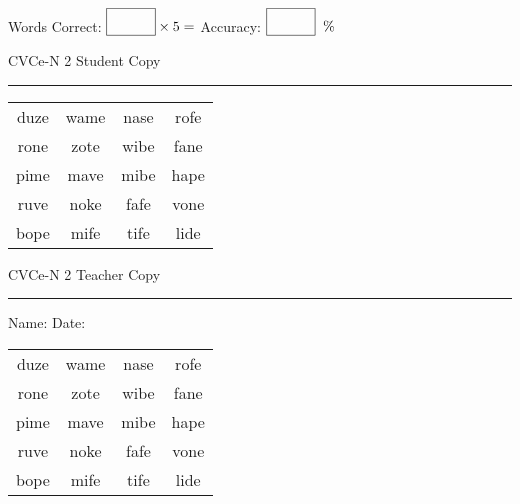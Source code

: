 \documentclass{memoir}
\begin{document}
\small

Words Correct: $\fbox{\phantom{\huge 100}} \times 5 = $ Accuracy: $\fbox{\phantom{\huge 100}}\;\; \%$ 

\vfill

\newpage


\footnotesize \noindent
CVCe-N 2 \hfill Student Copy
\smallskip
\hrule

\Large

\setlength{\tabcolsep}{14pt}
\def\arraystretch{2}

{\selectfont


\begin{vplace}[0.5]
\begin{center}
\begin{tabular}{cccc}
duze & wame & nase & rofe \\
rone & zote & wibe & fane \\
pime & mave & mibe & hape \\
ruve & noke & fafe & vone \\
bope & mife & tife & lide \\
\end{tabular}
\end{center}
\end{vplace}

}

\newpage

\footnotesize \noindent
CVCe-N 2 \hfill Teacher Copy
\smallskip
\hrule

\small

\vfill

\noindent
Name: \underline{\hspace{1.75in}} \hfill Date: \underline{\hspace{1in}}

\Large

{\selectfont


\begin{vplace}[0.5]
\begin{center}
\begin{tabular}{cccc}
duze & wame & nase & rofe \\
rone & zote & wibe & fane \\
pime & mave & mibe & hape \\
ruve & noke & fafe & vone \\
bope & mife & tife & lide \\
\end{tabular}
\end{center}
\end{vplace}



}
\end{document}
